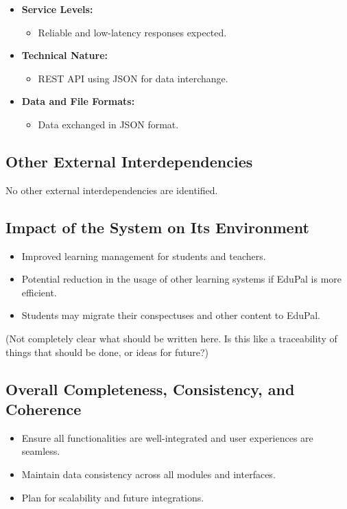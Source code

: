 \begin{itemize}
\begin{itemize}
          \end{itemize}
    \item \textbf{Service Levels:}
          \begin{itemize}
              \item Reliable and low-latency responses expected.
          \end{itemize}
    \item \textbf{Technical Nature:}
          \begin{itemize}
              \item REST API using JSON for data interchange.
          \end{itemize}
    \item \textbf{Data and File Formats:}
          \begin{itemize}
              \item Data exchanged in JSON format.
          \end{itemize}
\end{itemize}


\subsection{Other External Interdependencies}

No other external interdependencies are identified.


\subsection{Impact of the System on Its Environment}

\begin{itemize}
    \item Improved learning management for students and teachers.
    \item Potential reduction in the usage of other learning systems if EduPal is more efficient.
    \item Students may migrate their conspectuses and other content to EduPal.
\end{itemize}

(Not completely clear what should be written here. Is this like a traceability of things that should be done, or ideas for future?)
\subsection{Overall Completeness, Consistency, and Coherence}

\begin{itemize}
    \item Ensure all functionalities are well-integrated and user experiences are seamless.
    \item Maintain data consistency across all modules and interfaces.
    \item Plan for scalability and future integrations.
\end{itemize}

